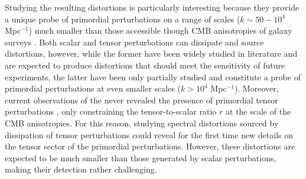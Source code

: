 Studying the resulting distortions is particularly interesting because they provide a unique probe of primordial perturbations on a range of scales ($k\sim50-10^{4}$ Mpc$^{-1}$) much smaller than those accessible though CMB anisotropies of galaxy surveys \cite{chlubafuturestepscosmologyusing}. Both scalar and tensor perturbations can dissipate and source distortions, however, while the former have been widely studied in literature \cite{Lucca_2020,Chluba_2x2} and are expected to produce distortions that should meet the sensitivity of future experiments, the latter have been only partially studied \cite{Chluba_tens_diss} and constitute a probe of primordial perturbations at even smaller scales ($k>10^{4}$ Mpc$^{-1}$). Moreover, current observations of the never revealed the presence of primordial tensor perturbations \cite{Ade_2021,planck2018results}, only constraining the tensor-to-scalar ratio $r$ at the scale of the CMB anisotropies. For this reason, studying spectral distortions sourced by dissipation of tensor perturbations could reveal for the first time new details on the tensor sector of the primordial perturbations. However, these distortions are expected to be much smaller than those generated by scalar perturbations, making their detection rather challenging. 

